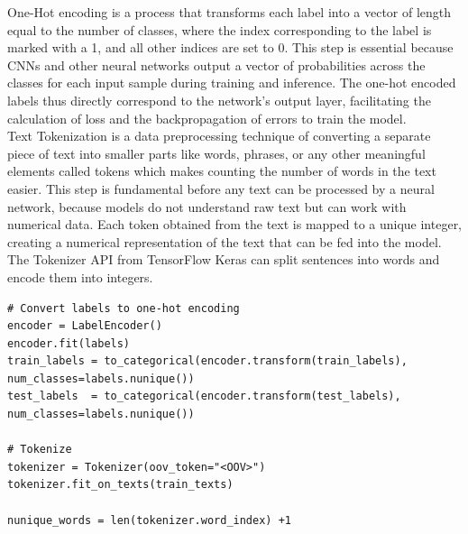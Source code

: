 One-Hot encoding is a process that transforms each label into a vector of length equal to the number of classes, where the index corresponding to the label is marked with a 1, and all other indices are set to 0. This step is essential because CNNs and other neural networks output a vector of probabilities across the classes for each input sample during training and inference. The one-hot encoded labels thus directly correspond to the network's output layer, facilitating the calculation of loss and the backpropagation of errors to train the model.
\\

Text Tokenization is a data preprocessing technique of converting a separate piece of text
into smaller parts like words, phrases, or any other meaningful elements called tokens
which makes counting the number of words in the text easier. This step is fundamental before any text can be processed by a neural network, because models do not understand raw text but can work with numerical data. Each token obtained from the text is mapped to a unique integer, creating a numerical representation of the text that can be fed into the model. The Tokenizer API from TensorFlow Keras can split sentences into words and encode them into integers.\\

\begin{lstlisting}
# Convert labels to one-hot encoding
encoder = LabelEncoder()
encoder.fit(labels)
train_labels = to_categorical(encoder.transform(train_labels), num_classes=labels.nunique())
test_labels  = to_categorical(encoder.transform(test_labels), num_classes=labels.nunique())

# Tokenize 	
tokenizer = Tokenizer(oov_token="<OOV>")
tokenizer.fit_on_texts(train_texts)
	
nunique_words = len(tokenizer.word_index) +1
\end{lstlisting}

